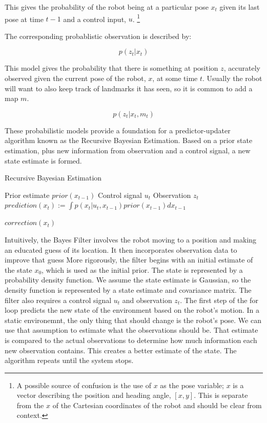 \documentclass[12pt]{report}
\begin{document}
This gives the probability of the robot being at a particular pose
$x_{t}$ given its last pose at time $t-1$ and a control input,
$u$. \footnote{A possible source of confusion is the use of $x$ as the
  pose variable; $x$ is a vector describing the position and heading
  angle, $[x,y]$.  This is separate from the $x$ of the Cartesian
  coordinates of the robot and should be clear from context.}

The corresponding probablistic observation is described by:

\begin{equation}\label{obs_stepA}
p(z_{t}|x_{t})
\end{equation}

This model gives the probability that there is something at position
$z$, accurately observed given the current pose of the robot,
$x$, at some time $t$.  Usually the robot will want to also keep track
of landmarks it has seen, so it is common to add a map $m$.

\begin{equation}\label{obs_stepA}
p(z_{t}|x_{t}, m_t)
\end{equation}

These probabilistic models provide a foundation for a
predictor-updater algorithm known as the Recursive Bayesian
Estimation\cite{SomeCitationHere}.  Based on a prior state estimation, plus new information
from observation and a control signal, a new state estimate is formed.

\begin{algorithm}     
\caption{Recursive Bayesian Estimation}
\label{Bayes_Filter}   
\begin{algorithmic}         
    \Require Prior estimate $prior(x_{t-1})$ \State Control signal
    $u_t$ \State Observation $z_t$  \State
             {$prediction(x_t) := \int p(x_t | u_t, x_{t-1})
               prior(x_{t-1}) dx_{t-1} $} 
               \EndFor

\State\Return $correction(x_t)$
\end{algorithmic}
\end{algorithm}

Intuitively, the Bayes Filter involves the robot moving to a position
and making an educated guess of its location. It then incorporates
observation data to improve that guess More rigorously, the filter
begins with an initial estimate of the state $x_0$, which is used as
the initial prior. The state is represented by a probability density
function. We assume the state estimate is Gaussian, so the density
function is represented by a state estimate and covariance matrix. The
filter also requires a control signal $u_t$ and observation $z_t$. The
first step of the for loop predicts the new state of the environment
based on the robot's motion. In a static environemnt, the only thing
that should change is the robot's pose. We can use that assumption to
estimate what the observations should be. That estimate is compared to
the actual observations to determine how much information each new
observation contains. This creates a better estimate of the state. The
algorithm repeats until the system stops.
\end{document}
